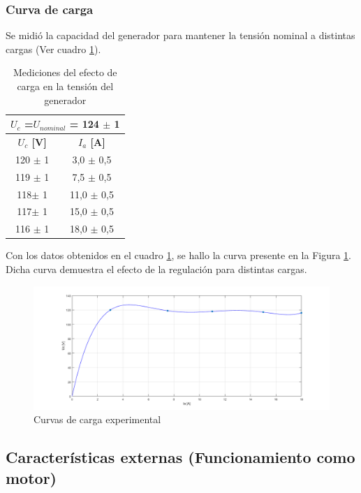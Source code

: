 \documentclass[11pt,letterpaper]{article}     %
\begin{document}
\subsubsection{Curva de carga}
Se midió la capacidad del generador para mantener la tensión nominal a distintas cargas (Ver cuadro \ref{MedCurvaCarga}). 
\begin{table}[H]
	\centering
	\caption{Mediciones del efecto de carga en la tensión del generador}
	\label{MedCurvaCarga}
	\begin{tabular}{|c|c|}
		\hline
		\multicolumn{2}{|c|}{\textbf{$U_{c}$ =$U_{nominal}$ = 124 $\pm$ 1}} \\ \hline
		\textbf{$U_{c}$ {[}V{]}}         & \textbf{$I_{a}$ {[}A{]}}         \\ \hline
		120 $\pm$ 1                      & 3,0 $\pm$ 0,5                    \\ \hline
		119 $\pm$ 1                      & 7,5 $\pm$ 0,5                    \\ \hline
		118$\pm$ 1                       & 11,0 $\pm$ 0,5                   \\ \hline
		117$\pm$ 1                       & 15,0 $\pm$ 0,5                   \\ \hline
		116 $\pm$ 1                      & 18,0 $\pm$ 0,5                   \\ \hline
	\end{tabular}
\end{table}
Con los datos obtenidos en el cuadro \ref{MedCurvaCarga}, se hallo la curva presente en la Figura \ref{fig:CurvaDeCarga}. Dicha curva demuestra el efecto de la regulación para distintas cargas.
\begin{figure}[H]
	\centering
	\includegraphics[scale=0.5]{./recursos-Lab6/CurvaDeCarga.png}
	\caption{Curvas de carga experimental}
	\label{fig:CurvaDeCarga}
\end{figure}
\subsection{Características externas (Funcionamiento como motor)}
\end{document}
